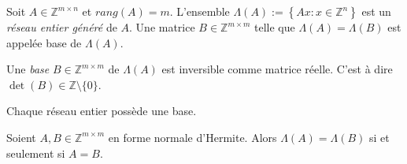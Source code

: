   \begin{definition}
    \label{def:61}
    Soit $A \in \mathbb{Z}^{m\times n}$ et  $rang(A)=m$. L'ensemble  $\Lambda(A):=\left\{ Ax: x\in \mathbb{Z}^{n} \right\}$ est  un \emph{réseau entier généré}  de $A$. Une matrice  $B \in \mathbb{Z}^{m\times m}$ telle que  $\Lambda(A)=\Lambda(B)$ est appelée base de $\Lambda(A)$. 
  \end{definition}

  \begin{remark}
    Une  \emph{base} $B ∈ ℤ^{m ×m}$  de $Λ(A)$ est inversible comme matrice réelle. C'est à dire $\det(B) ∈ℤ \setminus \{ 0\}$. 
  \end{remark}
	
 \begin{corollary}
   \label{co:12}
    Chaque réseau entier possède une base.
  \end{corollary}




  \begin{theorem}
    \label{thr:28a}
    Soient $A,B \in \mathbb{Z}^{m\times m}$ en forme normale
    d'Hermite.  Alors $Λ(A) = Λ(B)$ si et seulement si $A = B$.
  \end{theorem}

